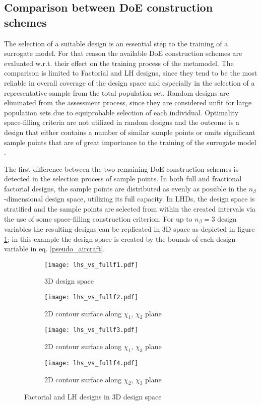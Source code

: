 \newpage


\subsection{Comparison between DoE construction schemes}
The selection of a suitable design is an essential step to
the training of a surrogate model. For that reason the 
available DoE construction schemes are evaluated w.r.t. their
effect on the training process of the metamodel. The 
comparison is limited to Factorial and LH designs, since they 
tend to be the most reliable in overall coverage of the design 
space and especially in the selection of a representative sample 
from the total population set. Random designs are eliminated from 
the assessment process, since they are considered unfit for large 
population sets due to equiprobable selection of each individual. 
Optimality space-filling criteria are not utilized in random 
designs and the outcome is a design that either contains a number 
of similar sample points or omits significant sample points 
that are of great importance to the training of the 
surrogate model \cite{Random}.

The first difference between the two remaining DoE 
construction schemes is detected in the selection process of 
sample points. In both full and fractional factorial designs, the 
sample points are distributed as evenly as possible in the 
$n_{β}$-dimensional design space, utilizing its full 
capacity. In LHDs, the design space is stratified and the 
sample points are selected from within the created intervals 
via the use of some space-filling construction criterion. 
For up to $n_{β} = 3$ design variables the resulting designs can 
be replicated in 3D space as depicted in figure 
\ref{fig:LH_vs_FD_in3D}; in this example the design space is 
created by the bounds of each design variable in eq. 
\ref{pseudo_aircraft}.

 \begin{figure}[h!]
    \centering
    \begin{subfigure}[b]{0.50\textwidth}
    \centering
    \texttt{[image: lhs\_vs\_fullf1.pdf]}
    \caption{3D design space} 
    \end{subfigure}  
\hfill
\begin{subfigure}[b]{0.49\textwidth}
    \centering
    \texttt{[image: lhs\_vs\_fullf2.pdf]} 
    \caption{2D contour surface along $χ_{1}$, $χ_{2}$ plane}
    \end{subfigure}
\hfill
\begin{subfigure}[b]{0.49\textwidth}
    \centering
    \texttt{[image: lhs\_vs\_fullf3.pdf]} 
    \caption{2D contour surface along $χ_{1}$, $χ_{3}$ plane}
    \end{subfigure}
\hfill
\begin{subfigure}[b]{0.49\textwidth}
    \centering
    \texttt{[image: lhs\_vs\_fullf4.pdf]}
    \caption{2D contour surface along $χ_{2}$, $χ_{3}$ plane} 
    \end{subfigure}
\caption{Factorial and LH designs in 3D design 
space} 
\label{fig:LH_vs_FD_in3D}      
\end{figure}

